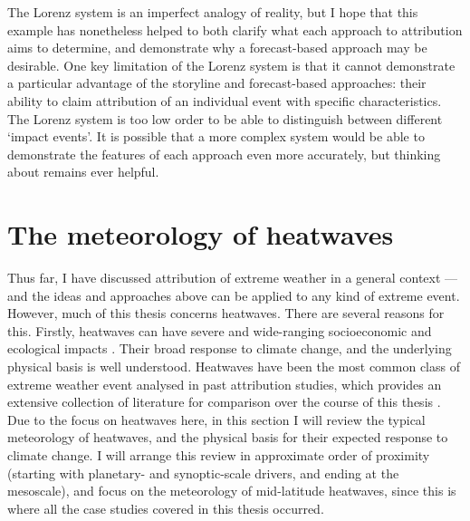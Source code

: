   The Lorenz system is an imperfect analogy of reality, but I hope that this example has nonetheless helped to both clarify what each approach to attribution aims to determine, and demonstrate why a forecast-based approach may be desirable. One key limitation of the Lorenz system is that it cannot demonstrate a particular advantage of the storyline and forecast-based approaches: their ability to claim attribution of an individual event with specific characteristics. The Lorenz system is too low order to be able to distinguish between different `impact events'. It is possible that a more complex system \citep[yet still simpler than the weather on Earth, e.g.][]{hagedorn_predictability_2006} would be able to demonstrate the features of each approach even more accurately, but thinking about \citet{lorenz_deterministic_1963} remains ever helpful.

\section{The meteorology of heatwaves}\label{intro:meteorology}

  Thus far, I have discussed attribution of extreme weather in a general context --- and the ideas and approaches above can be applied to any kind of extreme event. However, much of this thesis concerns heatwaves. There are several reasons for this. Firstly, heatwaves can have severe and wide-ranging socioeconomic and ecological impacts \citep{mitchell_attributing_2016,lo_estimating_2022,schauberger_consistent_2017,davis_arabica-like_2021}. Their broad response to climate change, and the underlying physical basis is well understood. Heatwaves have been the most common class of extreme weather event analysed in past attribution studies, which provides an extensive collection of literature for comparison over the course of this thesis \citep{noauthor_mapped_2021}. Due to the focus on heatwaves here, in this section I will review the typical meteorology of heatwaves, and the physical basis for their expected response to climate change. I will arrange this review in approximate order of proximity (starting with planetary- and synoptic-scale drivers, and ending at the mesoscale), and focus on the meteorology of mid-latitude heatwaves, since this is where all the case studies covered in this thesis occurred.

